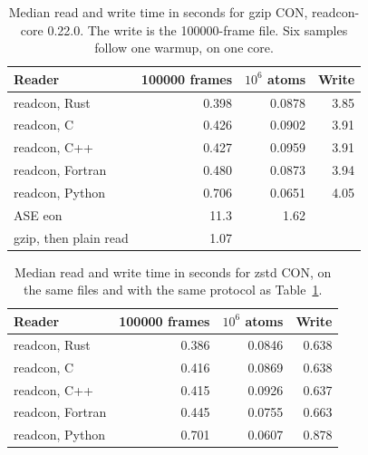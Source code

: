 \begin{table}[tbp]
\centering
\caption{Median read and write time in seconds for gzip CON, readcon-core 0.22.0.
The write is the \num{100000}-frame file.
Six samples follow one warmup, on one core.}
\label{tab:gzip}
\begin{tabular}{@{}lrrr@{}}
\toprule
Reader & \num{100000} frames & $10^{6}$ atoms & Write \\
\midrule
readcon, Rust & 0.398 & 0.0878 & 3.85 \\
readcon, C & 0.426 & 0.0902 & 3.91 \\
readcon, C++ & 0.427 & 0.0959 & 3.91 \\
readcon, Fortran & 0.480 & 0.0873 & 3.94 \\
readcon, Python & 0.706 & 0.0651 & 4.05 \\
ASE eon & 11.3 & 1.62 & \\
gzip, then plain read & 1.07 & & \\
\bottomrule
\end{tabular}
\end{table}

\begin{table}[tbp]
\centering
\caption{Median read and write time in seconds for zstd CON, on the same files and with the same protocol as Table~\ref{tab:gzip}.}
\label{tab:zstd}
\begin{tabular}{@{}lrrr@{}}
\toprule
Reader & \num{100000} frames & $10^{6}$ atoms & Write \\
\midrule
readcon, Rust & 0.386 & 0.0846 & 0.638 \\
readcon, C & 0.416 & 0.0869 & 0.638 \\
readcon, C++ & 0.415 & 0.0926 & 0.637 \\
readcon, Fortran & 0.445 & 0.0755 & 0.663 \\
readcon, Python & 0.701 & 0.0607 & 0.878 \\
\bottomrule
\end{tabular}
\end{table}
